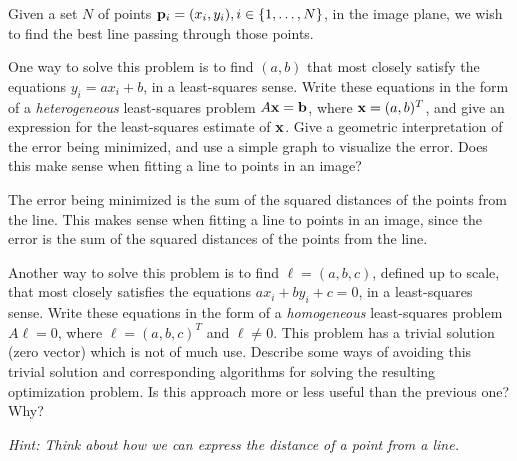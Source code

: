 \begin{problem}
  Given a set $N$ of points $\mathbf{p}_i = (x_i, y_i), i \in \left\{1, \ldots, N\right\}$,
  in the image plane, we wish to find the best line passing through those points.

  \begin{enumalph}
    \item One way to solve this problem is to find $(a, b)$ that most closely
      satisfy the equations $y_i = ax_i + b$, in a least-squares sense.
      Write these equations in the form of a \emph{heterogeneous}
      least-squares problem $A \mathbf{x} = \mathbf{b}$, where $\mathbf{x} = (a, b)^T$,
      and give an expression for the least-squares estimate of $\mathbf{x}$.
      Give a geometric interpretation of the error being minimized,
      and use a simple graph to visualize the error.
      Does this make sense when fitting a line to points in an image?
      \begin{Answer}
        The error being minimized is the sum of the squared distances
        of the points from the line.
        This makes sense when fitting a line to points in an image,
        since the error is the sum of the squared distances of the
        points from the line.

      \end{Answer}

    \newpage
    \item Another way to solve this problem is to find
      $\ell = (a, b, c)$, defined up to scale, that
      most closely satisfies the equations $ax_i + by_i + c = 0$,
      in a least-squares sense.
      Write these equations in the form of a \emph{homogeneous}
      least-squares problem $A \ell = 0$, where $\ell = (a, b, c)^T$
      and $\ell \ne 0$.
      This problem has a trivial solution (zero vector) which is not
      of much use. Describe some ways of avoiding this trivial solution
      and corresponding algorithms for solving the resulting
      optimization problem. Is this approach more or less
      useful than the previous one? Why?
      
      \step
      \emph{Hint: Think about how we can express the distance of a
      point from a line.}
      \begin{Answer}
      \end{Answer}
  \end{enumalph}
\end{problem}
